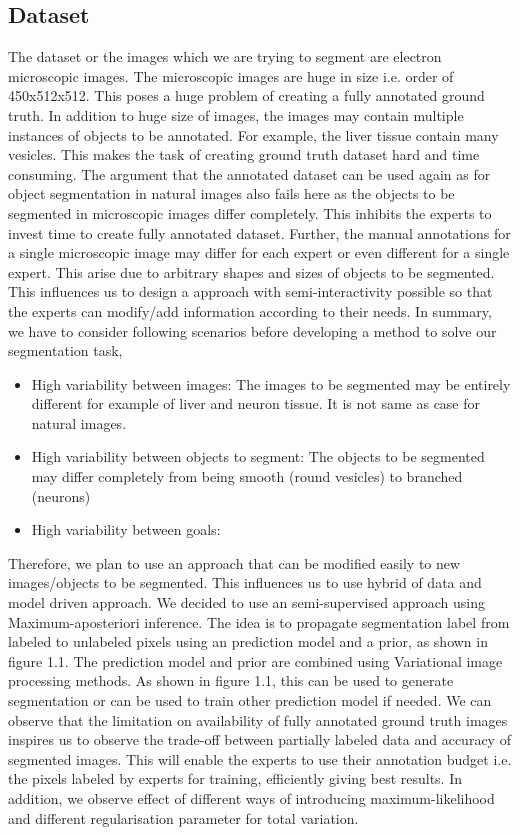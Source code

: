 \subsection{Dataset}
The dataset or the images which we are trying to segment are electron microscopic images. The microscopic images are huge in size i.e. order of 450x512x512. This poses a huge problem of creating a fully annotated ground truth. In addition to huge size of images, the images may contain multiple instances of objects to be annotated. For example, the liver tissue contain many vesicles. This makes the task of creating ground truth dataset hard and time consuming. The argument that the annotated dataset can be used again as for object segmentation in natural images also fails here as the objects to be segmented in microscopic images differ completely. This inhibits the experts to invest time to create fully annotated dataset. Further, the manual annotations for a single microscopic image may differ for each expert or even different for a single expert. This arise due to arbitrary shapes and sizes of objects to be segmented. This influences us to design a approach with semi-interactivity possible so that the experts can modify/add information according to their needs. In summary, we have to consider following scenarios before developing a method to solve our segmentation task, 
\begin{itemize}
\item High variability between images: The images to be segmented may be entirely different for example of liver and neuron tissue. It is not same as case for natural images.
\item High variability between objects to segment: The objects to be segmented may differ completely from being smooth (round vesicles) to branched (neurons)
\item High variability between goals: 
\end{itemize}

Therefore, we plan to use an approach that can be modified easily to new images/objects to be segmented. This influences us to use hybrid of data and model driven approach. We decided to use an semi-supervised approach using Maximum-aposteriori inference. The idea is to propagate segmentation label from labeled to unlabeled pixels using an prediction model and a prior, as shown in figure 1.1. The prediction model and prior are combined using Variational image processing methods. As shown in figure 1.1, this can be used to generate segmentation or can be used to train other prediction model if needed.
We can observe that the limitation on availability of fully annotated ground truth images inspires us to observe the trade-off between partially labeled data and accuracy of segmented images. This will enable the experts to use their annotation budget i.e. the pixels labeled by experts for training, efficiently giving best results. In addition, we observe effect of different ways of introducing maximum-likelihood and different regularisation parameter for total variation.


